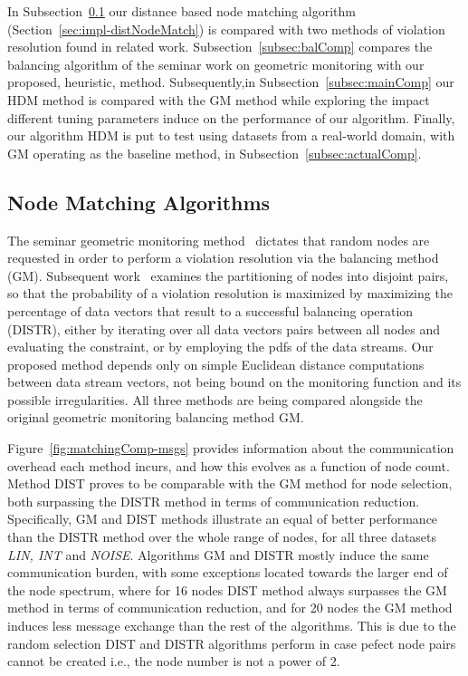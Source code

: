 In Subsection~\ref{subsec:matchingComp} our distance based node matching algorithm (Section~\ref{sec:impl-distNodeMatch}) is compared with two methods of violation resolution found in related work. Subsection~\ref{subsec:balComp} compares the balancing algorithm of the seminar work on geometric monitoring with our proposed, heuristic, method. Subsequently,in Subsection~\ref{subsec:mainComp} our HDM method is compared with the GM method while exploring the impact different tuning parameters induce on the performance of our algorithm. Finally, our algorithm HDM is put to test using datasets from a real-world domain, with GM operating as the baseline method, in Subsection~\ref{subsec:actualComp}.

\subsection{Node Matching Algorithms} \label{subsec:matchingComp}

The seminar geometric monitoring method~\cite{Sharfman2006GM} dictates that random nodes are requested in order to perform a violation resolution via the balancing method (GM). Subsequent work~\cite{Keren2014GMHetStreams} examines the partitioning of nodes into disjoint pairs, so that the probability of a violation resolution is maximized by maximizing the percentage of data vectors that result to a successful balancing operation (DISTR), either by iterating over all data vectors pairs between all nodes and evaluating the constraint, or by employing the pdfs of the data streams. Our proposed method depends only on simple Euclidean distance computations between data stream vectors, not being bound on the monitoring function and its possible irregularities. All three methods are being compared alongside the original geometric monitoring balancing method GM.

Figure~\ref{fig:matchingComp-msgs} provides information about the communication overhead each method incurs, and how this evolves as a function of node count. Method DIST proves to be comparable with the GM method for node selection, both surpassing the DISTR method in terms of communication reduction. Specifically, GM and DIST methods illustrate an equal of better performance than the DISTR method over the whole range of nodes, for all three datasets \emph{LIN, INT} and \emph{NOISE}. Algorithms GM and DISTR mostly induce the same communication burden, with some exceptions located towards the larger end of the node spectrum, where for 16 nodes DIST method always surpasses the GM method in terms of communication reduction, and for 20 nodes the GM method induces less message exchange than the rest of the algorithms. This is due to the random selection DIST and DISTR algorithms perform in case pefect node pairs cannot be created i.e., the node number is not a power of 2.

